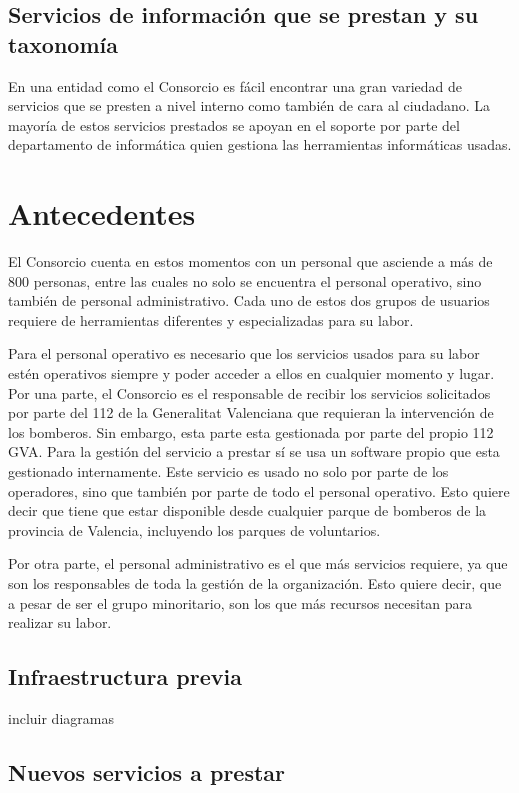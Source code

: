 \documentclass[12pt,a4paper,titlepage,twoside]{report}
\begin{document}
\section{Servicios de información que se prestan y su taxonomía}
En una entidad como el Consorcio es fácil encontrar una gran variedad de servicios que se presten a nivel interno como también de cara al ciudadano. La mayoría de estos servicios prestados se apoyan en el soporte por parte del departamento de informática quien gestiona las herramientas informáticas usadas.

\chapter{Antecedentes}
El Consorcio cuenta en estos momentos con un personal que asciende a más de 800 personas, entre las cuales no solo se encuentra el personal operativo, sino también de personal administrativo. Cada uno de estos dos grupos de usuarios requiere de herramientas diferentes y especializadas para su labor. 
\par
Para el personal operativo es necesario que los servicios usados para su labor estén operativos siempre y poder acceder a ellos en cualquier momento y lugar. Por una parte, el Consorcio es el responsable de recibir los servicios solicitados por parte del 112 de la Generalitat Valenciana que requieran la intervención de los bomberos. Sin embargo, esta parte esta gestionada por parte del propio 112 GVA. Para la gestión del servicio a prestar sí se usa un software propio que esta gestionado internamente. Este servicio es usado no solo por parte de los operadores, sino que también por parte de todo el personal operativo. Esto quiere decir que tiene que estar disponible desde cualquier parque de bomberos de la provincia de Valencia, incluyendo los parques de voluntarios.
\par
Por otra parte, el personal administrativo es el que más servicios requiere, ya que son los responsables de toda la gestión de la organización. Esto quiere decir, que a pesar de ser el grupo minoritario, son los que más recursos necesitan para realizar su labor.
\section{Infraestructura previa}
incluir diagramas
\section{Nuevos servicios a prestar}
\end{document}
